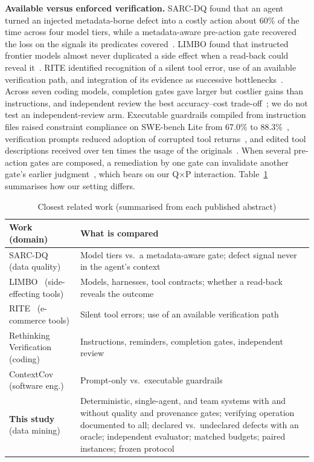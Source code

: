 \documentclass[conference]{IEEEtran}
\begin{document}
\textbf{Available versus enforced verification.}
SARC-DQ found that an agent turned an injected metadata-borne defect into a costly action about 60\% of the time
across four model tiers, while a metadata-aware pre-action gate recovered the loss on the signals its predicates
covered~\cite{besanson2026sarcdq}. LIMBO found that instructed frontier models almost never duplicated a side effect
when a read-back could reveal it~\cite{li2026limbo}. RITE identified recognition of a silent tool error, use of an
available verification path, and integration of its evidence as successive bottlenecks~\cite{zhang2026rite}.
Across seven coding models, completion gates gave larger but costlier gains than instructions, and independent review
the best accuracy--cost trade-off~\cite{zhang2026rethinking}; we do not test an independent-review arm. Executable
guardrails compiled from instruction files raised constraint compliance on SWE-bench Lite from 67.0\% to
88.3\%~\cite{sharma2026contextcov}, verification prompts reduced adoption of corrupted tool
returns~\cite{yang2026overreliance}, and edited tool descriptions received over ten times the usage of the
originals~\cite{faghih2025toolprefs}. When several pre-action gates are composed, a remediation by one gate can invalidate another gate's earlier
judgment~\cite{besanson2026onegate}, which bears on our Q$\times$P interaction. Table~\ref{tab:position} summarises
how our setting differs.

\begin{table}[t]
\caption{Closest related work (summarised from each published abstract)}
\label{tab:position}
\centering\footnotesize\setlength{\tabcolsep}{3pt}
\begin{tabular}{@{}>{\raggedright\arraybackslash}p{}>{\raggedright\arraybackslash}p{}@{}}
\toprule
Work (domain) & What is compared \\
\midrule
SARC-DQ~\cite{besanson2026sarcdq} (data quality) & Model tiers vs.\ a metadata-aware gate; defect signal never in the agent's context \\
LIMBO~\cite{li2026limbo} (side-effecting tools) & Models, harnesses, tool contracts; whether a read-back reveals the outcome \\
RITE~\cite{zhang2026rite} (e-commerce tools) & Silent tool errors; use of an available verification path \\
Rethinking Verification~\cite{zhang2026rethinking} (coding) & Instructions, reminders, completion gates, independent review \\
ContextCov~\cite{sharma2026contextcov} (software eng.) & Prompt-only vs.\ executable guardrails \\
\midrule
\textbf{This study} (data mining) & Deterministic, single-agent, and team systems with and without quality and
provenance gates; verifying operation documented to all; declared vs.\ undeclared defects with an oracle; independent
evaluator; matched budgets; paired instances; frozen protocol \\
\bottomrule
\end{tabular}
\end{table}
\end{document}
